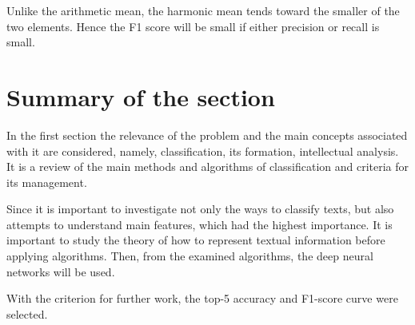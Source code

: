 Unlike the arithmetic mean, the harmonic mean tends toward the smaller of the two elements. Hence the F1 score will be small if either precision or recall is small.

\section{Summary of the section}

In the first section the relevance of the problem and the main concepts associated with it are considered, namely, classification, its formation, intellectual analysis. It is a review of the main methods and algorithms of classification and criteria for its management.

Since it is important to investigate not only the ways to classify texts, but also attempts to understand main features, which had the highest importance. It is important to study the theory of how to represent textual information before applying algorithms. Then, from the examined algorithms, the deep neural networks will be used. 

With the criterion for further work, the top-5 accuracy and F1-score curve were selected.
